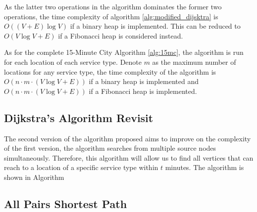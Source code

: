 As the latter two operations in the algorithm dominates the former two operations, the time complexity of algorithm \ref{alg:modified_dijsktra} is $O((V+E)\log V)$ if a binary heap is implemented. This can be reduced to $O(V\log V+E)$ if a Fibonacci heap is considered instead.

As for the complete 15-Minute City Algorithm \ref{alg:15mc}, the algorithm is run for each location of each service type. Denote $m$ as the maximum number of locations for any service type, the time complexity of the algorithm is $O(n\cdot m\cdot(V\log V+E))$ if a binary heap is implemented and $O(n\cdot m\cdot(V\log V+E))$ if a Fibonacci heap is implemented. 

\subsection{Dijkstra's Algorithm Revisit}

The second version of the algorithm proposed aims to improve on the complexity of the first version, the algorithm searches from multiple source nodes simultaneously. Therefore, this algorithm will allow us to find all vertices that can reach to a location of a specific service type within $t$ minutes. The algorithm is shown in Algorithm %

\subsection{All Pairs Shortest Path}

